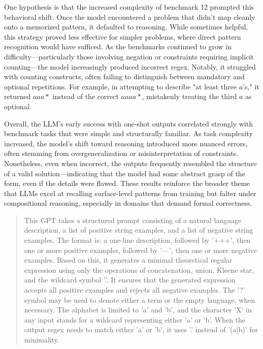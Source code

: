 \indent\indent One hypothesis is that the increased complexity of benchmark 12 prompted this behavioral shift. Once the model encountered a problem that didn't map cleanly onto a memorized pattern, it defaulted to reasoning. While sometimes helpful, this strategy proved less effective for simpler problems, where direct pattern recognition would have sufficed. As the benchmarks continued to grow in difficulty—particularly those involving negation or constraints requiring implicit counting—the model increasingly produced incorrect regex. Notably, it struggled with counting constructs, often failing to distinguish between mandatory and optional repetitions. For example, in attempting to describe "at least three $a$'s," it returned $aaa*$ instead of the correct $aaaa*$, mistakenly treating the third $a$ as optional.

\indent\indent Overall, the LLM's early success with one-shot outputs correlated strongly with benchmark tasks that were simple and structurally familiar. As task complexity increased, the model's shift toward reasoning introduced more nuanced errors, often stemming from overgeneralization or misinterpretation of constraints. Nonetheless, even when incorrect, the outputs frequently resembled the structure of a valid solution—indicating that the model had some abstract grasp of the form, even if the details were flawed. These results reinforce the broader theme that LLMs excel at recalling surface-level patterns from training but falter under compositional reasoning, especially in domains that demand formal correctness.


\begin{quote}
    This GPT takes a structured prompt consisting of a natural language description, a list of positive string examples, and a list of negative string examples. The format is: a one-line description, followed by '+++', then one or more positive examples, followed by '---', then one or more negative examples. Based on this, it generates a minimal theoretical regular expression using only the operations of concatenation, union, Kleene star, and the wildcard symbol '.'. It ensures that the generated expression accepts all positive examples and rejects all negative examples. The '?' symbol may be used to denote either a term or the empty language, when necessary. The alphabet is limited to 'a' and 'b', and the character 'X' in any input stands for a wildcard representing either 'a' or 'b'. When the output regex needs to match either 'a' or 'b', it uses '.' instead of '(a|b)' for minimality.
\end{quote}

